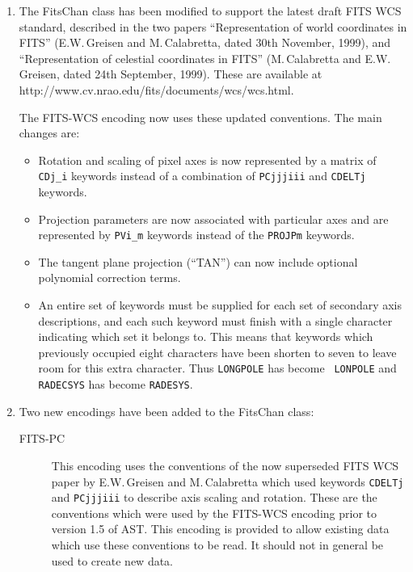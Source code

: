 \documentclass[twoside,11pt]{article}
\newcommand{\htmladdnormallink}[2]{#1}
\newcommand{\htmlref}[2]{#1}
\begin{document}
\begin{enumerate}

\item The \htmlref{FitsChan}{FitsChan} class has been modified to support the latest draft
FITS WCS standard, described in the two papers ``Representation of world
coordinates in FITS'' (E.W.\,Greisen and M.\,Calabretta, dated 30th
November, 1999), and ``Representation of celestial coordinates in FITS''
(M.\,Calabretta and E.W.\,Greisen, dated 24th September, 1999). These are
available at
\htmladdnormallink{http://www.cv.nrao.edu/fits/documents/wcs/wcs.html}
{http://www.cv.nrao.edu/fits/documents/wcs/wcs.html}.

The FITS-WCS encoding now uses these updated conventions. The main
changes are:

\begin{itemize}
\item Rotation and scaling of pixel axes is now represented by a matrix
of {\tt CDj\_i} keywords instead of a combination of {\tt PCjjjiii} and
{\tt CDELTj} keywords.
\item \htmlref{Projection}{Projection} parameters are now associated with particular axes and
are represented by {\tt PVi\_m} keywords instead of the {\tt PROJPm}
keywords.
\item The tangent plane projection (``TAN'') can now include optional 
polynomial correction terms.
\item An entire set of keywords must be supplied for each set of secondary 
axis descriptions, and each such keyword must finish with a single
character indicating which set it belongs to. This means that keywords
which previously occupied eight characters have been shorten to seven to
leave room for this extra character. Thus {\tt LONGPOLE} has become {\tt
LONPOLE} and {\tt RADECSYS} has become {\tt RADESYS}.
\end{itemize}

\item Two new encodings have been added to the FitsChan class:
\begin{description}

\item [FITS-PC] This encoding uses the conventions of the now superseded
FITS WCS paper by E.W.\,Greisen and M.\,Calabretta which used keywords
{\tt CDELTj} and {\tt PCjjjiii} to describe axis scaling and rotation.
These are the conventions which were used by the FITS-WCS encoding prior
to version 1.5 of AST. This encoding is provided to allow existing data
which use these conventions to be read. It should not in general be used
to create new data.


\end{description}
\end{enumerate}
\end{document}
